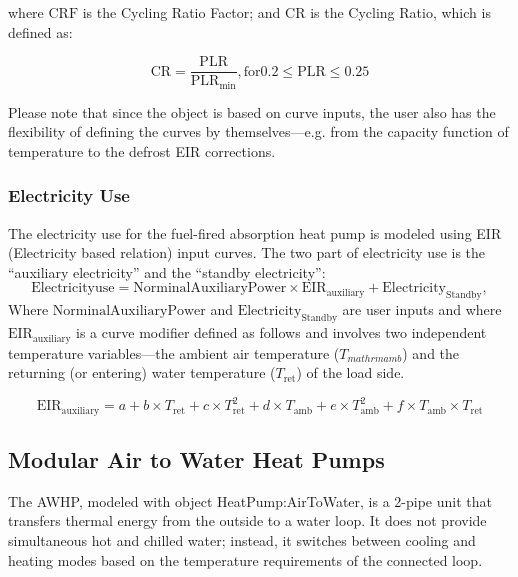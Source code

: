 where $\mathrm{CRF}$ is the Cycling Ratio Factor; and $\mathrm{CR}$ is the Cycling Ratio, which is defined as:

\begin{equation}
\mathrm{CR} = \frac{\mathrm{PLR}}{\mathrm{PLR}_{\mathrm{min}}}, \mathrm{for} 0.2 \leq \mathrm{PLR} \leq 0.25
\end{equation}

Please note that since the object is based on curve inputs, the user also has the flexibility of defining the curves by themselves---e.g. from the capacity function of temperature to the defrost EIR corrections.

\subsubsection{Electricity Use}

The electricity use for the fuel-fired absorption heat pump is modeled using EIR (Electricity based relation) input curves. The two part of electricity use is the ``auxiliary electricity'' and the ``standby electricity'':
\begin{equation}
\mathrm{Electricity use} = \mathrm{Norminal Auxiliary Power} \times \mathrm{EIR}_{\mathrm{auxiliary}} + \mathrm{Electricity}_{\mathrm{Standby}},
\end{equation}
Where $\mathrm{Norminal Auxiliary Power}$ and $\mathrm{Electricity}_{\mathrm{Standby}}$ are user inputs and where $\mathrm{EIR}_{\mathrm{auxiliary}}$ is a curve modifier defined as follows and involves two independent temperature variables---the ambient air temperature ($T_{mathrm{amb}}$) and the returning (or entering) water temperature ($T_{\mathrm{ret}}$) of the load side.

\begin{equation}
\mathrm{EIR}_{\mathrm{auxiliary}} = a + b \times T_{\mathrm{ret}} + c \times T_{\mathrm{ret}}^{2} + d \times T_{\mathrm{amb}} + e \times T_{\mathrm{amb}}^{2} + f \times T_{\mathrm{amb}} \times T_{\mathrm{ret}}
\end{equation}

\subsection{Modular Air to Water Heat Pumps}\label{modular-air-to-water-heat-pumps}

The AWHP, modeled with object HeatPump:AirToWater, is a 2-pipe unit that
transfers thermal energy from the outside to a water loop. It does not provide
simultaneous hot and chilled water; instead, it switches between cooling and
heating modes based on the temperature requirements of the connected loop.

